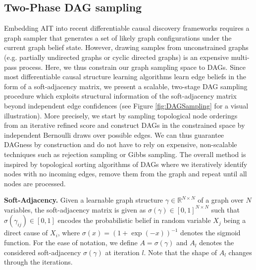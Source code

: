 \documentclass[nohyperref]{article}
\theoremstyle{plain}
\theoremstyle{definition}
\theoremstyle{remark}
\begin{document}
\subsection{Two-Phase DAG sampling}
\label{sec:method_DAGsampling}
Embedding AIT into recent differentiable causal discovery frameworks requires a graph sampler that generates a set of likely graph configurations under the current graph belief state. However, drawing samples from unconstrained graphs (e.g. partially undirected graphs or cyclic directed graphs) is an expensive multi-pass process. Here, we thus constrain our graph sampling space to DAGs. Since most differentiable causal structure learning algorithms learn edge beliefs in the form of a soft-adjacency matrix, we present a scalable, two-stage DAG sampling procedure which exploits structural information of the soft-adjacency matrix beyond independent edge confidences (see Figure \ref{fig:DAGSampling} for a visual illustration). More precisely, we start by sampling topological node orderings from an iterative refined score and construct DAGs in the constrained space by independent Bernoulli draws over possible edges. We can thus guarantee DAGness by construction and do not have to rely on expensive, non-scalable techniques such as rejection sampling or Gibbs sampling. The overall method is inspired by topological sorting algorithms of DAGs where we iteratively identify nodes with no incoming edges, remove them from the graph and repeat until all nodes are processed.

\vspace{-1mm}
\textbf{Soft-Adjacency.} Given a learnable graph structure $\gamma \in \mathbb{R}^{N \times N}$ of a graph over $N$ variables, the soft-adjacency matrix is given as $\sigma(\gamma) \in [0,1]^{N \times N}$ such that $\sigma{(\gamma_{ij})} \in [0,1]$ encodes the probabilistic belief in random variable $X_j$ being a direct cause of $X_i$, where $\sigma(x) = (1+\exp(-x))^{-1}$ denotes the sigmoid function. For the ease of notation, we define $A = \sigma(\gamma)$ and $A_l$ denotes the considered soft-adjacency $\sigma(\gamma)$ at iteration $l$. Note that the shape of $A_l$ changes through the iterations.
\end{document}
